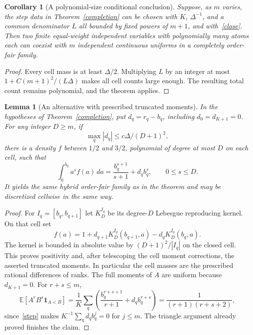 \documentclass[11pt]{article}
\newtheorem{lemma}{Lemma}
\newtheorem{corollary}{Corollary}
\newcommand{\E}{\mathbb E}
\begin{document}
\begin{corollary}[A polynomial-size conditional conclusion]\label{poly}
Suppose, as $m$ varies, the step data in Theorem~\ref{completion} can
be chosen with $K$, $\Delta^{-1}$, and a common denominator $L$ all
bounded by fixed powers of $m+1$, and with~\eqref{close}. Then two
finite equal-weight independent variables with polynomially many
atoms each can coexist with $m$ independent continuous uniforms in
a completely order-fair family.
\end{corollary}
\begin{proof}
Every cell mass is at least $\Delta/2$. Multiplying $L$ by an integer
at most $1+C(m+1)^2/(L\Delta)$ makes all cell counts large enough.
The resulting total count remains polynomial, and the theorem applies.
\end{proof}

\begin{lemma}[An alternative with prescribed truncated moments]\label{prefix}
In the hypotheses of Theorem~\ref{completion}, put $d_q=r_q-b_q$,
including $d_0=d_{K+1}=0$. For any integer $D\ge m$, if
\[
 \max_q|d_q|\le c\Delta/(D+1)^2,
\]
there is a density $f$ between $1/2$ and $3/2$, polynomial of degree
at most $D$ on each cell, such that
\[
 \int_0^{b_q} a^s f(a)\,da
 =\frac{b_q^{s+1}}{s+1}+d_q b_q^s,
 \qquad 0\le s\le D.
\]
It yields the same hybrid order-fair family as in the theorem and
may be discretized cellwise in the same way.
\end{lemma}
\begin{proof}
For $I_q=[b_q,b_{q+1}]$ let $K_D^{I_q}$ be its degree-$D$ Lebesgue
reproducing kernel. On that cell set
\[
 f(a)=1+d_{q+1}K_D^{I_q}(b_{q+1},a)
          -d_qK_D^{I_q}(b_q,a).
\]
The kernel is bounded in absolute value by $(D+1)^2/|I_q|$ on the
closed cell. This proves positivity and, after telescoping the cell
moment corrections, the asserted truncated moments. In particular
the cell masses are the prescribed rational differences of ranks.
The full moments of $A$ are uniform because $d_{K+1}=0$. For $r+s\le m$,
\[
 \E[A^rB^s\mathbf1_{A<B}]
 =\frac1K\sum_q\left(\frac{b_q^{r+s+1}}{r+1}
                          +d_qb_q^{r+s}\right)
 =\frac1{(r+1)(r+s+2)},
\]
since~\eqref{step} makes $K^{-1}\sum_qd_qb_q^j=0$ for $j\le m$.
The triangle argument already proved finishes the claim.
\end{proof}
\end{document}
